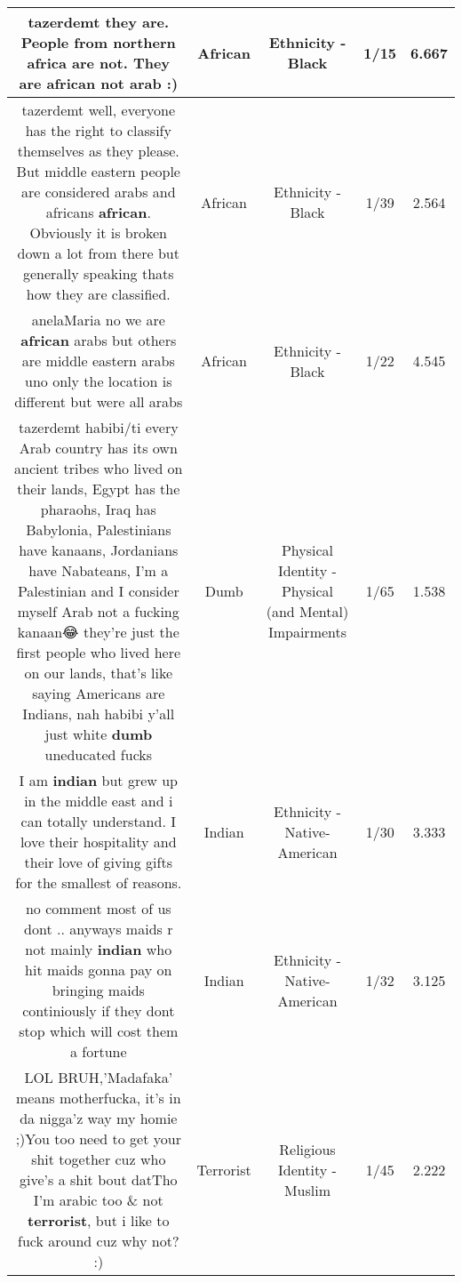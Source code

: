\documentclass[11pt]{article}
\newlength\mylength
\begin{document}
\begin{center}
\begin{longtable}{|C{.65\mylength}|C{.30\mylength}|C{.12\mylength}|C{.12\mylength}|C{.12\mylength}|}
  \small tazerdemt they are. People from northern africa are not. They are \textbf{african} not arab :)\normalsize   & African & Ethnicity - Black & 1/15 & 6.667 \\  \hline
  \small tazerdemt well, everyone has the right to classify themselves as they please. But middle eastern people are considered arabs and africans \textbf{african}. Obviously it is broken down a lot from there but generally speaking thats how they are classified.\normalsize   & African & Ethnicity - Black & 1/39 & 2.564 \\  \hline
  \small anelaMaria no we are \textbf{african} arabs but others are middle eastern arabs uno only the location is different but were all arabs\normalsize   & African & Ethnicity - Black & 1/22 & 4.545 \\  \hline
  \small tazerdemt habibi/ti every Arab country has its own ancient tribes who lived on their lands, Egypt has the pharaohs, Iraq has Babylonia, Palestinians have kanaans, Jordanians have Nabateans, I'm a Palestinian and I consider myself Arab not a fucking kanaan😂 they're just the first people who lived here on our lands, that's like saying Americans are Indians, nah habibi y'all just white \textbf{dumb} uneducated fucks\normalsize   & Dumb & Physical Identity - Physical (and Mental) Impairments & 1/65 & 1.538 \\  \hline
  \small I am \textbf{indian} but grew up in the middle east and i can totally understand. I love their hospitality and their love of giving gifts for the smallest of reasons.\normalsize   & Indian & Ethnicity - Native-American & 1/30 & 3.333 \\  \hline
  \small no comment most of us dont .. anyways maids r not mainly \textbf{indian} who hit maids gonna pay on bringing maids continiously if they dont stop which will cost them a fortune\normalsize   & Indian & Ethnicity - Native-American & 1/32 & 3.125 \\  \hline
  \small LOL BRUH,'Madafaka' means motherfucka, it's in da nigga'z way my homie ;)You too need to get your shit together cuz who give's a shit bout datTho I'm arabic too \& not \textbf{terrorist}, but i like to fuck around cuz why not? :)\normalsize   & Terrorist & Religious Identity - Muslim & 1/45 & 2.222 \\  \hline

\end{longtable}
\end{center}
\end{document}
